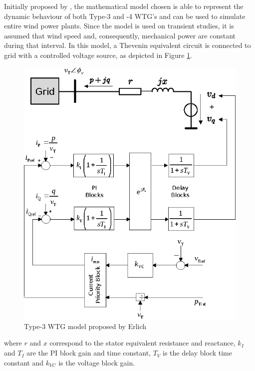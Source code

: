 Initially proposed by \cite{Erlich2012}, the mathematical model chosen is able to represent the dynamic behaviour of both Type-3 and -4 WTG's and can be used to simulate entire wind power plants. Since the model is used on transient studies, it is assumed that wind speed and, consequently, mechanical power are constant during that interval. In this model, a Thevenin equivalent circuit is connected to grid with a controlled voltage source, as depicted in Figure \ref{fig: ErlMod}.

\begin{figure}[h]
	\caption{Type-3 WTG model proposed by Erlich}
	\begin{center}
		\includegraphics[scale=1]{Images/ErlichModel.eps}
	\end{center}
	\label{fig: ErlMod}
\end{figure}

\noindent where $r$ and $x$ correspond to the stator equivalent resistance and reactance, $k_{I}$ and $T_{I}$ are the PI block gain and time constant, $T_{V}$ is the delay block time constant and $k_{VC}$ is the voltage block gain.

